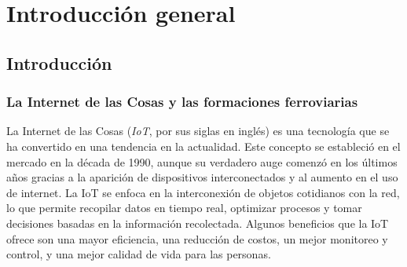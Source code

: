 
\chapter{Introducción general} %

\label{Chapter1} %
\label{IntroGeneral}


\newcommand{\keyword}[1]{\textbf{#1}}
\newcommand{\tabhead}[1]{\textbf{#1}}
\newcommand{\code}[1]{\texttt{#1}}
\newcommand{\file}[1]{\texttt{\bfseries#1}}
\newcommand{\option}[1]{\texttt{\itshape#1}}
\newcommand{\grados}{$^{\circ}$}



\section{Introducción}

\subsection{La Internet de las Cosas y las formaciones ferroviarias}


La Internet de las Cosas (\textit{IoT}, por sus siglas en inglés) es una tecnología que se ha convertido en una tendencia en la actualidad. Este concepto se estableció en el mercado en la década de 1990, aunque su verdadero auge comenzó en los últimos años gracias a la aparición de dispositivos interconectados y al aumento en el uso de internet. La IoT se enfoca en la interconexión de objetos cotidianos con la red, lo que permite recopilar datos en tiempo real, optimizar procesos y tomar decisiones basadas en la información recolectada. Algunos beneficios que la IoT ofrece son una mayor eficiencia, una reducción de costos, un mejor monitoreo y control, y una mejor calidad de vida para las personas.

